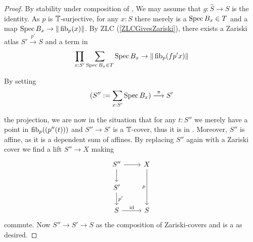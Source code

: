 \begin{proof}
	By stability under composition of \Cov, We may assume that $g : \hat{S} \to S$ is the identity.
	As $p$ is $\mathbb{T}$-surjective, for any $x : S$ there merely is a $\operatorname{Spec} B_x \in T$  and a map $\operatorname{Spec} B_x \to \| \operatorname{fib}_p (x) \| $. 
	By ZLC  (\ref{ZLCGivesZariski}), there exists a Zariski atlas $S' \overset{p'}{\to} S$ and a term in
	\[\prod_{x : S'} \sum_{\operatorname{Spec} B_x \in T} \operatorname{Spec} B_x \to \| \operatorname{fib}_p (fp' x)\| \]
	
	By setting 
	\[(S'' := \sum_{x : S'} \operatorname{Spec} B_x) \overset{\pi}{\longrightarrow} S' \]
	
	the projection, we are now in the situation that for any $t : S''$ we merely have a point in $\operatorname{fib}_p((p''(t)))$ and $S'' \to S'$ is a $\mathbb{T}$-cover, thus it is in \Cov. Moreover, $S''$ is affine, as it is a dependent sum of affines. By replacing $S''$ again with a Zariski cover we find a lift $S'' \to X$     
	making
	\[\begin{tikzcd}
		{S''} & X \\
		{S'} \\
		S & S
		\arrow[from=1-1, to=1-2]
		\arrow[from=1-1, to=2-1]
		\arrow["p"', from=1-2, to=3-2]
		\arrow["{p'}", from=2-1, to=3-1]
		\arrow["\id", from=3-1, to=3-2]
	\end{tikzcd}\]
	commute. Now $S'' \to S' \to S$ as the composition of Zariski-covers and \Cover is a \Cover \details as desired.
\end{proof}
